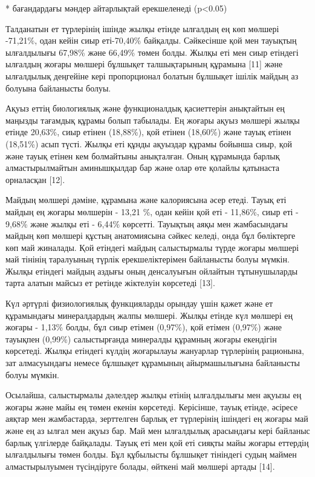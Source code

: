 * бағандардағы мәндер айтарлықтай ерекшеленеді (p\textless0.05)

\begin{multicols}{2}
Талданатын ет түрлерінің ішінде жылқы етінде ылғалдың ең көп мөлшері
-71,21\%, одан кейін сиыр еті-70,40\% байқалды. Сәйкесінше қой мен
тауықтың ылғалдылығы 67,98\% және 66,49\% төмен болды. Жылқы еті мен
сиыр етіндегі ылғалдың жоғары мөлшері бұлшықет талшықтарының құрамына
{[}11{]} және ылғалдылық деңгейіне кері пропорционал болатын бұлшықет
ішілік майдың аз болуына байланысты болуы.

Ақуыз еттің биологиялық және функционалдық қасиеттерін анықтайтын ең
маңызды тағамдық құрамы болып табылады. Ең жоғары ақуыз мөлшері жылқы
етінде 20,63\%, сиыр етінен (18,88\%), қой етінен (18,60\%) және тауық
етінен (18,51\%) асып түсті. Жылқы еті құнды ақуыздар құрамы бойынша
сиыр, қой және тауық етінен кем болмайтыны анықталған. Оның құрамында
барлық алмастырылмайтын аминышқылдар бар және олар өте қолайлы қатынаста
орналасқан {[}12{]}.

Майдың мөлшері дәміне, құрамына және калориясына әсер етеді. Тауық еті
майдың ең жоғары мөлшерін - 13,21 \%, одан кейін қой еті - 11,86\%, сиыр
еті - 9,68\% және жылқы еті - 6,44\% көрсетті. Тауықтың аяқы мен
жамбасындағы майдың көп мөлшері құстың анатомиясына сәйкес келеді, онда
бұл бөліктерге көп май жиналады. Қой етіндегі майдың салыстырмалы түрде
жоғары мөлшері май тінінің таралуының түрлік ерекшеліктерімен байланысты
болуы мүмкін. Жылқы етіндегі майдың аздығы оның денсалуығын ойлайтын
тұтынушыларды тарта алатын майсыз ет ретінде жіктелуін көрсетеді
{[}13{]}.

Күл әртүрлі физиологиялық функцияларды орындау үшін қажет және ет
құрамындағы минералдардың жалпы мөлшері. Жылқы етінде күл мөлшері ең
жоғары - 1,13\% болды, бұл сиыр етімен (0,97\%), қой етімен (0,97\%)
және тауықпен (0,99\%) салыстырғанда минералды құрамның жоғары екендігін
көрсетеді. Жылқы етіндегі күлдің жоғарылауы жануарлар түрлерінің
рационына, зат алмасуындағы немесе бұлшықет құрамының айырмашылығына
байланысты болуы мүмкін.

Осылайша, салыстырмалы дәлелдер жылқы етінің ылғалдылығы мен ақуызы ең
жоғары және майы ең төмен екенін көрсетеді. Керісінше, тауық етінде,
әсіресе аяқтар мен жамбастарда, зерттелген барлық ет түрлерінің ішіндегі
ең жоғары май және ең аз ылғал мен ақуыз бар. Май мен ылғалдылық
арасындағы кері байланыс барлық үлгілерде байқалады. Тауық еті мен қой
еті сияқты майы жоғары еттердің ылғалдылығы төмен болды. Бұл құбылысты
бұлшықет тініндегі судың маймен алмастырылуымен түсіндіруге болады,
өйткені май мөлшері артады {[}14{]}.


\end{multicols}
